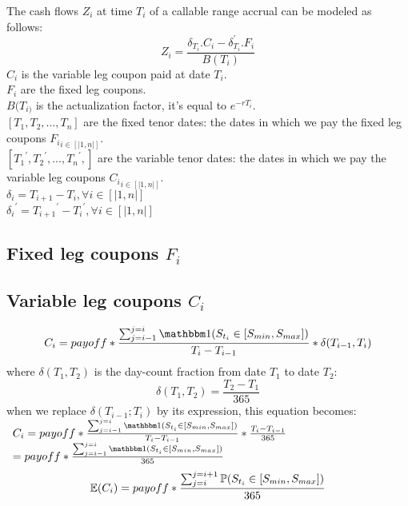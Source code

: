 \documentclass[12pt]{article}
\begin{document}
				The cash flows $Z_{i}$ at time $T_i$ of a callable range accrual can be modeled as follows:
				\begin{equation}
					Z_i=\frac{\delta_{T_i} . C_i -\delta_{T_i}^{'} . F_i}{B(T_i)}
				\end{equation}
				$C_{i}$ is the variable leg coupon paid at date $T_i$.\\
				$F_{i}$ are the fixed leg coupons.\\
				$B(T_{i)}$ is the actualization factor, it's equal to $e^{-rT_{i}}$.\\
				$[T_{1}, T_{2},..., T_{n}]$ are the fixed tenor dates: the dates in which we pay the fixed leg coupons ${F_{i}}_{i \in [|1,n|]}$.\\
				$[{T_{1}}^{'}, {T_{2}}^{'},..., {T_{n}}^{'},]$ are the variable tenor dates: the dates in which we pay the variable leg coupons ${C_{i}}_{i \in [|1,n|]}$.\\
				${\delta}_{i} = T_{i+1} - T_{i},  \forall i \in [|1,n|]$\\
				${{\delta}_{i}}^{'} = {T_{i+1}}^{'} - {T_{i}}^{'},  \forall i \in [|1,n|]$\\

				\subsection{Fixed leg coupons $F_{i}$}
				\subsection{Variable leg coupons $C_{i}$}
					\begin{equation*}
						C_i=payoff * \frac{\sum_{j=i - 1}^{j=i}\indicator (S_{t_i} \in [S_{min},S_{max}])}{T_i - T_{i-1}} * \delta(T_{i-1}, T_i)
					\end{equation*}
					where $\delta(T_1, T_2) $ is the day-count fraction from date $T_1$ to date $T_2$:\\
					$$
					\delta(T_1, T_2) = \frac{T_2 - T_1}{365}
					$$
					when we replace $\delta(T_{i-1}; T_i)$ by its expression, this equation becomes:\\
					$\begin{array}{lcl}
					C_i=payoff * \frac{\sum_{j=i - 1}^{j=i}\indicator (S_{t_i} \in [S_{min},S_{max}])}{T_i - T_{i-1}} * \frac{T_i - T_{i-1}}{365} \\

					=payoff * \frac{\sum_{j=i - 1}^{j=i}\indicator (S_{t_i} \in [S_{min},S_{max}])}{365}
					\end{array}$
					\begin{equation*}
					\E(C_i)=payoff * \frac{\sum_{j=i}^{j=i+1} \PP (S_{t_i} \in [S_{min},S_{max}])}{365}
					\end{equation*}
					
\end{document}
